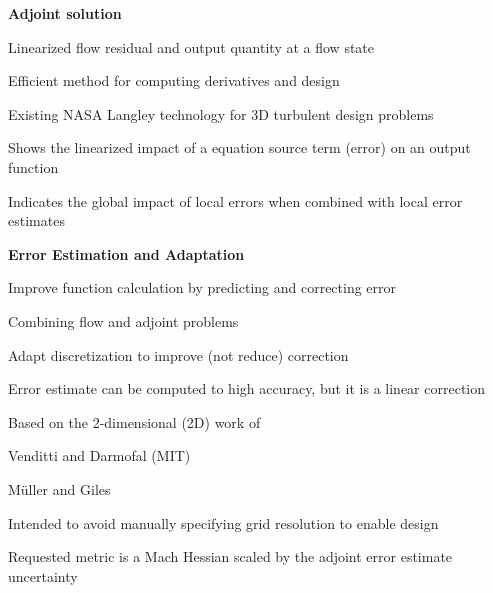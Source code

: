 \documentclass[landscape]{slides}
\renewcommand{\title}[1]{{\large\bfseries #1}}
\newenvironment{itemiz}%
  {\begin{list}{}{\raggedright
      \setlength{\itemsep}{2pt}%
      \setlength{\parskip}{4pt}\setlength{\parsep}{2pt}}}%
  {\end{list}}%
\begin{document}
 \begin{slide}
   \title{ Adjoint solution }
   \begin{itemiz}
   \item Linearized flow residual and output quantity at a flow state
   \item Efficient method for computing derivatives and design
   \item Existing NASA Langley technology for 3D turbulent design problems
   \item Shows the linearized impact of a equation source term (error)
     on an output function
   \item Indicates the global impact of local errors when combined with
   local error estimates
   \end{itemiz}
 \end{slide}

 \begin{slide}
   \title{Error Estimation and Adaptation}
   \begin{itemiz}
   \item Improve function calculation by predicting and correcting error
   \item Combining flow and adjoint problems
   \item Adapt discretization to improve (not reduce) correction
     \begin{itemiz}
     \item Error estimate can be computed to high accuracy, but it is
       a linear correction
     \end{itemiz}
   \item Based on the 2-dimensional (2D) work of 
     \begin{itemiz}
     \item Venditti and Darmofal (MIT)
     \item M\"uller and Giles
     \end{itemiz}
   \item Intended to avoid manually specifying grid resolution
     to enable design
   \item Requested metric is a Mach Hessian scaled by the adjoint
   error estimate uncertainty
   \end{itemiz}
 \end{slide}
\end{document}
